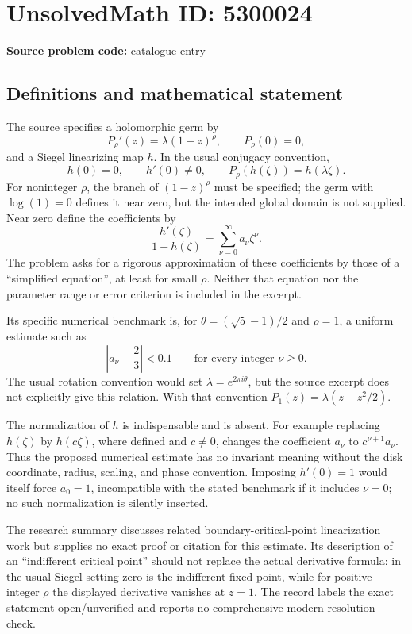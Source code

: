 \documentclass[11pt]{article}
\begin{document}
\section*{UnsolvedMath ID: 5300024}
\textbf{Source problem code:} catalogue entry
\subsection{Definitions and mathematical statement}
The source specifies a holomorphic germ by
\[
 P_\rho'(z)=\lambda(1-z)^\rho,\qquad P_\rho(0)=0,
\]
and a Siegel linearizing map \(h\). In the usual conjugacy convention,
\[
 h(0)=0,\qquad h'(0)\ne0,\qquad P_\rho(h(\zeta))=h(\lambda\zeta).
\]
For noninteger \(\rho\), the branch of \((1-z)^\rho\) must be specified; the germ with \(\log(1)=0\) defines it near zero, but the intended global domain is not supplied. Near zero define the coefficients by
\[
 \frac{h'(\zeta)}{1-h(\zeta)}=\sum_{\nu=0}^{\infty}a_\nu\zeta^\nu.
\]
The problem asks for a rigorous approximation of these coefficients by those of a ``simplified equation'', at least for small \(\rho\). Neither that equation nor the parameter range or error criterion is included in the excerpt.

Its specific numerical benchmark is, for \(\theta=(\sqrt5-1)/2\) and \(\rho=1\), a uniform estimate such as
\[
 \left|a_\nu-\frac23\right|<0.1\qquad\text{for every integer }\nu\ge0.
\]
The usual rotation convention would set \(\lambda=e^{2\pi i\theta}\), but the source excerpt does not explicitly give this relation. With that convention \(P_1(z)=\lambda(z-z^2/2)\).

The normalization of \(h\) is indispensable and is absent. For example replacing \(h(\zeta)\) by \(h(c\zeta)\), where defined and \(c\ne0\), changes the coefficient \(a_\nu\) to \(c^{\nu+1}a_\nu\). Thus the proposed numerical estimate has no invariant meaning without the disk coordinate, radius, scaling, and phase convention. Imposing \(h'(0)=1\) would itself force \(a_0=1\), incompatible with the stated benchmark if it includes \(\nu=0\); no such normalization is silently inserted.

The research summary discusses related boundary-critical-point linearization work but supplies no exact proof or citation for this estimate. Its description of an ``indifferent critical point'' should not replace the actual derivative formula: in the usual Siegel setting zero is the indifferent fixed point, while for positive integer \(\rho\) the displayed derivative vanishes at \(z=1\). The record labels the exact statement open/unverified and reports no comprehensive modern resolution check.
\end{document}
